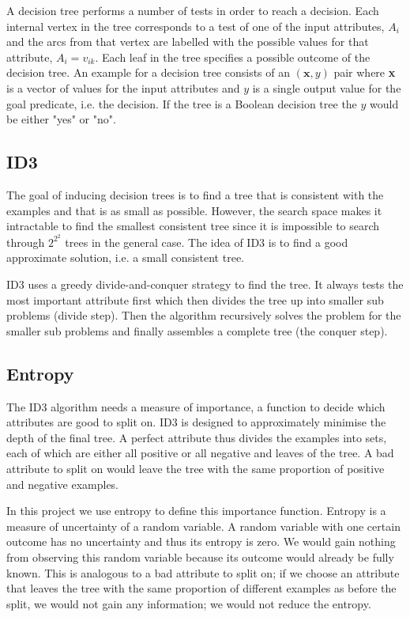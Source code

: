 \documentclass{article}
\begin{document}
A decision tree performs a number of tests in order to reach a decision. Each internal vertex in the tree corresponds to a test of one of the input attributes, $A_i$ and the arcs from that vertex are labelled with the possible values for that attribute, $A_i = v_{ik}$. Each leaf in the tree specifies a possible outcome of the decision tree. An example for a decision tree consists of an $(\textbf{x}, y)$ pair where \textbf{x} is a vector of values for the input attributes and $y$ is a single output value for the goal predicate, i.e. the decision. If the tree is a Boolean decision tree the $y$ would be either "yes" or "no".


\subsection{ID3}
The goal of inducing decision trees is to find a tree that is consistent with the examples and that is as small as possible. However, the search space makes it intractable to find the smallest consistent tree since it is impossible to search through $2^{2^2}$ trees in the general case. The idea of ID3 is to find a good approximate solution, i.e. a small consistent tree.

ID3 uses a greedy divide-and-conquer strategy to find the tree. It always tests the most important attribute first which then divides the tree up into smaller sub problems (divide step). Then the algorithm recursively solves the problem for the smaller sub problems and finally assembles a complete tree (the conquer step).

\subsection{Entropy}
The ID3 algorithm needs a measure of importance, a function to decide which attributes are good to split on. ID3 is designed to approximately minimise the depth of the final tree. A perfect attribute thus divides the examples into sets, each of which are either all positive or all negative and leaves of the tree. A bad attribute to split on would leave the tree with the same proportion of positive and negative examples.

In this project we use entropy to define this importance function. Entropy is a measure of uncertainty of a random variable. A random variable with one certain outcome has no uncertainty and thus its entropy is zero. We would gain nothing from observing this random variable because its outcome would already be fully known. This is analogous to a bad attribute to split on; if we choose an attribute that leaves the tree with the same proportion of different examples as before the split, we would not gain any information; we would not reduce the entropy.
\end{document}
